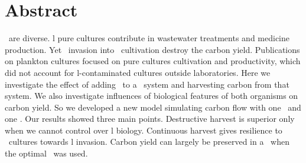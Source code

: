 \documentclass[../thesis.tex]{subfiles} %
\begin{document}
\section{Abstract}
\Bac\ are diverse.  \Bac l pure cultures contribute in wastewater treatments and medicine production.  Yet \bac\ invasion into \phy\ cultivation destroy the carbon yield.  Publications on plankton cultures focused on pure cultures cultivation and productivity, which did not account for \bac l-contaminated cultures outside laboratories.  Here we investigate the effect of adding \bac\ to a \phy\ system and harvesting carbon from that system.  We also investigate influences of biological features of both organisms on carbon yield.  So we developed a new model simulating carbon flow with one \phy\ and one \bac.  Our results showed three main points.  Destructive harvest is superior only when we cannot control over \bac l biology.  Continuous harvest gives resilience to \phy\ cultures towards \bac l invasion.  Carbon yield can largely be preserved in a \pbs\ when the optimal \bac\ was used.
\end{document}
